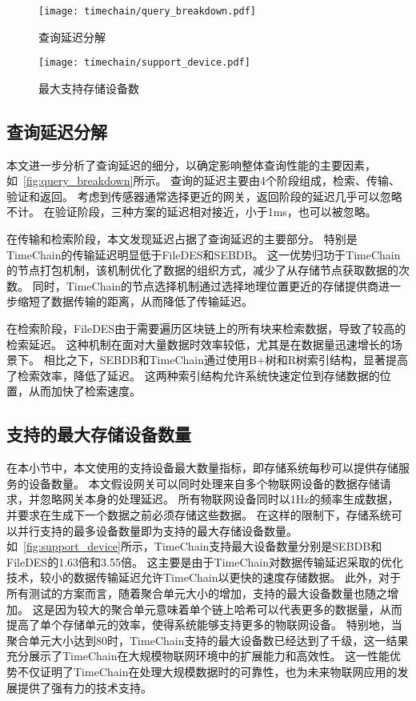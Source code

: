 \begin{figure*}[t]
    \centering
    \begin{minipage}{0.48\linewidth}
        \centering
        \texttt{[image: timechain/query\_breakdown.pdf]}
        \caption{查询延迟分解}
        \label{fig:query_breakdown}
	\end{minipage}
	\quad
	\begin{minipage}{0.48\linewidth}
        \centering
        \texttt{[image: timechain/support\_device.pdf]}
        \caption{最大支持存储设备数}
        \label{fig:support_device}
    \end{minipage}
\end{figure*}

\subsection{查询延迟分解}
本文进一步分析了查询延迟的细分，以确定影响整体查询性能的主要因素，如~\autoref{fig:query_breakdown}所示。
查询的延迟主要由4个阶段组成，检索、传输、验证和返回。
考虑到传感器通常选择更近的网关，返回阶段的延迟几乎可以忽略不计。
在验证阶段，三种方案的延迟相对接近，小于1ms，也可以被忽略。

在传输和检索阶段，本文发现延迟占据了查询延迟的主要部分。
特别是TimeChain的传输延迟明显低于FileDES和SEBDB。
这一优势归功于TimeChain的节点打包机制，该机制优化了数据的组织方式，减少了从存储节点获取数据的次数。
同时，TimeChain的节点选择机制通过选择地理位置更近的存储提供商进一步缩短了数据传输的距离，从而降低了传输延迟。

在检索阶段，FileDES由于需要遍历区块链上的所有块来检索数据，导致了较高的检索延迟。
这种机制在面对大量数据时效率较低，尤其是在数据量迅速增长的场景下。
相比之下，SEBDB和TimeChain通过使用B+树和R树索引结构，显著提高了检索效率，降低了延迟。
这两种索引结构允许系统快速定位到存储数据的位置，从而加快了检索速度。

\subsection{支持的最大存储设备数量}
在本小节中，本文使用的支持设备最大数量指标，即存储系统每秒可以提供存储服务的设备数量。
本文假设网关可以同时处理来自多个物联网设备的数据存储请求，并忽略网关本身的处理延迟。
所有物联网设备同时以1Hz的频率生成数据，并要求在生成下一个数据之前必须存储这些数据。
在这样的限制下，存储系统可以并行支持的最多设备数量即为支持的最大存储设备数量。
如~\autoref{fig:support_device}所示，TimeChain支持最大设备数量分别是SEBDB和FileDES的1.63倍和3.55倍。
这主要是由于TimeChain对数据传输延迟采取的优化技术，较小的数据传输延迟允许TimeChain以更快的速度存储数据。
此外，对于所有测试的方案而言，随着聚合单元大小的增加，支持的最大设备数量也随之增加。
这是因为较大的聚合单元意味着单个链上哈希可以代表更多的数据量，从而提高了单个存储单元的效率，使得系统能够支持更多的物联网设备。
特别地，当聚合单元大小达到80时，TimeChain支持的最大设备数已经达到了千级，这一结果充分展示了TimeChain在大规模物联网环境中的扩展能力和高效性。
这一性能优势不仅证明了TimeChain在处理大规模数据时的可靠性，也为未来物联网应用的发展提供了强有力的技术支持。

